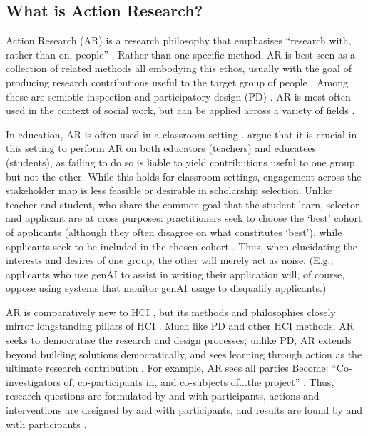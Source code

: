 \subsection{What is Action Research?}\label{ssec:par}
Action Research (AR) is a research philosophy that emphasises ``research with, rather than on, people'' \cite{bradbury_action_2003}. Rather than one specific method, AR is best seen as a collection of related methods all embodying this ethos, usually with the goal of producing research contributions useful to the target group of people \cite{lu_organizing_2023}. Among these are semiotic inspection \cite{DeSouza_Leitão_2009,Alvarado_Waern_2018} and participatory design  (PD) \cite{braun_using_2006,Griffiths_Johnson_Hartley_2007,blythe2014research,Knapp_Zeratzky_Kowitz_2016}. AR is most often used in the context of social work, but can be applied across a variety of fields \cite{dombrowski_social_2016,lu_organizing_2023}. 

In education, AR is often used in a classroom setting \cite{Mertler_2019}. \textcite{venn-wycherley_realities_2024} argue that it is crucial in this setting to perform AR on both educators (teachers) and educatees (students), as failing to do so is liable to yield contributions useful to one group but not the other. While this holds for classroom settings, engagement across the stakeholder map is less feasible or desirable in scholarship selection. Unlike teacher and student, who share the common goal that the student learn, selector and applicant are at cross purposes: practitioners seek to choose the `best' cohort of applicants (although they often disagree on what constitutes `best'), while applicants seek to be included in the chosen cohort \cite{bergman2021seven}. Thus, when elucidating the interests and desires of one group, the other will merely act as noise. (E.g., applicants who use genAI to assist in writing their application will, of course, oppose using systems that monitor genAI usage to disqualify applicants.)

AR is comparatively new to HCI \cite{Hayes_2011,lu_organizing_2023}, but its methods and philosophies closely mirror longstanding pillars of HCI \cite{Hayes_2011}. Much like PD and other HCI methods, AR seeks to democratise the research and design processes; unlike PD, AR extends beyond building solutions democratically, and sees learning through action as the ultimate research contribution \cite{Hayes_2011}. For example, AR sees all parties Become: ``Co-investigators of, co-participants in, and co-subjects of...the project'' \cite{Hayes_2011}.  Thus, research questions are formulated by and with participants, actions and interventions are designed by and with participants, and results are found by and with participants \cite{Hayes_2011}.

